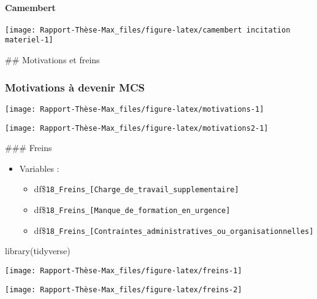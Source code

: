 \documentclass[
]{article}
\begin{document}
\paragraph{Camembert}\label{camembert-5}

\begin{center}\texttt{[image: Rapport-Thèse-Max\_files/figure-latex/camembert incitation materiel-1]} \end{center}

\hfill\break
\hfill\break
\#\# Motivations et freins

\subsubsection{Motivations à devenir
MCS}\label{motivations-uxe0-devenir-mcs}

\begin{center}\texttt{[image: Rapport-Thèse-Max\_files/figure-latex/motivations-1]} \end{center}

\begin{center}\texttt{[image: Rapport-Thèse-Max\_files/figure-latex/motivations2-1]} \end{center}

\hfill\break
\hfill\break
\#\#\# Freins

\begin{itemize}
\item
  Variables :

  \begin{itemize}
  \item
    df\$\texttt{18\_Freins\_{[}Charge\_de\_travail\_supplementaire{]}}
  \item
    df\$\texttt{18\_Freins\_{[}Manque\_de\_formation\_en\_urgence{]}}
  \item
    df\$\texttt{18\_Freins\_{[}Contraintes\_administratives\_ou\_organisationnelles{]}}
  \end{itemize}
\end{itemize}

library(tidyverse)

\begin{center}\texttt{[image: Rapport-Thèse-Max\_files/figure-latex/freins-1]} \end{center}

\begin{center}\texttt{[image: Rapport-Thèse-Max\_files/figure-latex/freins-2]} \end{center}
\end{document}
